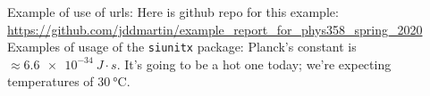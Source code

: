 \documentclass[11pt,usenames,dvipsnames]{article}
\begin{document}
\noindent
Example of use of urls: Here is github repo for this example:\\ \url{https://github.com/jddmartin/example_report_for_phys358_spring_2020}\\

\noindent
Examples of usage of the \verb$siunitx$ package: Planck's constant is $ \approx \SI{6.6e-34}{J \cdot s}$.  It's going to be a hot one today; we're expecting temperatures of $\SI{30}{\celsius}$.\\
\end{document}

